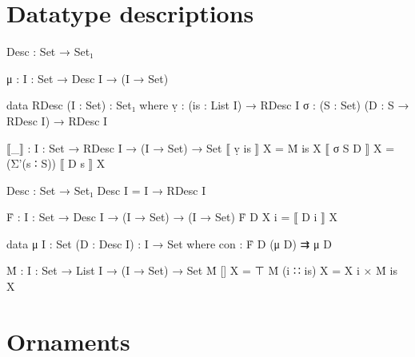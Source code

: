 \section{Datatype descriptions}

\begin{code}
Desc : Set → Set₁

μ : {I : Set} → Desc I → (I → Set)

data RDesc (I : Set) : Set₁ where
  ṿ  :  (is : List I) → RDesc I
  σ  :  (S : Set) (D : S → RDesc I) → RDesc I
  
⟦_⟧ : {I : Set} → RDesc I → (I → Set) → Set
⟦  ṿ is   ⟧  X  =  Ṁ is X
⟦  σ S D  ⟧  X  =  (Σ'(s ∶ S)) ⟦ D s ⟧ X

Desc : Set → Set₁
Desc I = I → RDesc I

Ḟ : {I : Set} → Desc I → (I → Set) → (I → Set)
Ḟ D X i = ⟦ D i ⟧ X

data μ {I : Set} (D : Desc I) : I → Set where
  con : Ḟ D (μ D) ⇉ μ D
\end{code}

\begin{code}
Ṁ : {I : Set} → List I → (I → Set) → Set
Ṁ  []        X  =  ⊤
Ṁ  (i ∷ is)  X  =  X i × Ṁ is X
\end{code}


\section{Ornaments}


